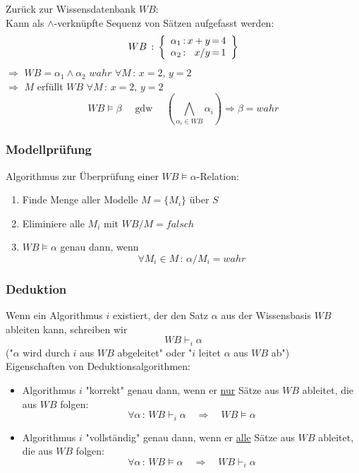 Zurück zur Wissensdatenbank $WB$: \\
Kann als $\wedge$-verknüpfte Sequenz von Sätzen aufgefasst werden:
$$WB \, : \, \left\{ \begin{array}{r @{\, : \,} r @{\, = \,} l} \alpha_1 & x+y & 4 \\ \alpha_2 & x/y & 1 \end{array} \right\}$$
$\Rightarrow$ $WB = \alpha_1 \wedge \alpha_2$ $wahr$ $\forall M \, : \, x=2, \, y=2$ \\
$\Rightarrow$ $M$ erfüllt $WB$ $\forall M \, : \, x=2, \, y=2$ \\
$$WB \models \beta \quad \textrm{ gdw } \quad \left( \bigwedge\limits_{\alpha_i \in WB} \alpha_i \right) \Rightarrow \beta = wahr$$

\subsubsection*{Modellprüfung}

Algorithmus zur Überprüfung einer $WB \models \alpha$-Relation:
\begin{enumerate}
\item Finde Menge aller Modelle $M = \{M_i\}$ über $S$
\item Eliminiere alle $M_i$ mit $WB/M = falsch$
\item $WB \models \alpha$ genau dann, wenn $$\forall M_i \in M \, : \, \alpha / M_i = wahr$$
\end{enumerate}

\subsubsection*{Deduktion}

Wenn ein Algorithmus $i$ existiert, der den Satz $\alpha$ aus der Wissensbasis $WB$ ableiten kann, schreiben wir $$WB \vdash_i \alpha$$
("{}$\alpha$ wird durch $i$ aus $WB$ abgeleitet"{} oder "{}$i$ leitet $\alpha$ aus $WB$ ab"{}) \\[0,1cm]
Eigenschaften von Deduktionsalgorithmen:
\begin{itemize}
\item Algorithmus $i$ "{}korrekt"{} genau dann, wenn er \underline{nur} Sätze aus $WB$ ableitet, die aus $WB$ folgen: $$\forall \alpha \, : \, WB \vdash_i \alpha \quad \Rightarrow \quad WB \models \alpha$$
\item Algorithmus $i$ "{}vollständig"{} genau dann, wenn er \underline{alle} Sätze aus $WB$ ableitet, die aus $WB$ folgen: $$\forall \alpha \, : \, WB \models \alpha \quad \Rightarrow \quad WB \vdash_i \alpha$$
\end{itemize}

